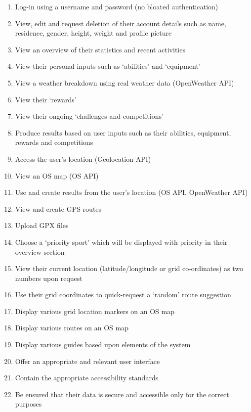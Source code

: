 \documentclass[11pt, english]{article}
\begin{document}
	\begin{enumerate}
	\setlength\itemsep{0cm}
		\item Log-in using a username and password (no bloated authentication)
		\item View, edit and request deletion of their account details such as name, residence, gender, height, weight and profile picture
		\item View an overview of their statistics and recent activities
		\item View their personal inputs such as `abilities' and `equipment'
		\item View a weather breakdown using real weather data (OpenWeather API)
		\item View their `rewards'
		\item View their ongoing `challenges and competitions'
		\item Produce results based on user inputs such as their abilities, equipment, rewards and competitions
		\item Access the user's location (Geolocation API)
		\item View an OS map (OS API)
		\item Use and create results from the user's location (OS API, OpenWeather API)
		\item View and create GPS routes
		\item Upload GPX files
		\item Choose a `priority sport' which will be displayed with priority in their overview section
		\item View their current location (latitude/longitude or grid co-ordinates) as two numbers upon request
		\item Use their grid coordinates to quick-request a `random' route suggestion
		\item Display various grid location markers on an OS map
		\item Display various routes on an OS map
		\item Display various guides based upon elements of the system
		\item Offer an appropriate and relevant user interface 
		\item Contain the appropriate accessibility standards
		\item Be ensured that their data is secure and accessible only for the correct purposes
	\end{enumerate}
\end{document}

